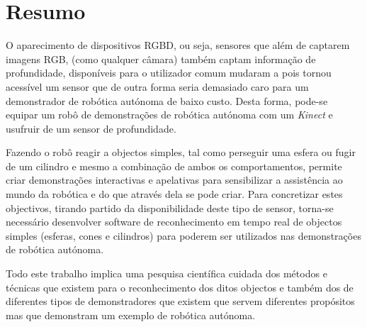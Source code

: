 \chapter{Resumo}

O aparecimento de dispositivos RGBD, ou seja, sensores que além de captarem imagens RGB,
(como qualquer câmara) também captam informação de profundidade, disponíveis para o utilizador
comum mudaram a pois tornou acessível um sensor que de outra forma seria demasiado caro
para um demonstrador de robótica autónoma de baixo custo. Desta forma, pode-se equipar um robô de demonstrações de
robótica autónoma com um \emph{Kinect} e usufruir de um sensor de profundidade.

Fazendo o robô reagir a objectos simples, tal como perseguir uma esfera ou
fugir de um cilindro e mesmo a combinação de ambos os comportamentos, permite 
criar demonstrações interactivas e apelativas para sensibilizar a assistência 
ao mundo da robótica e do que através dela se pode criar. Para concretizar estes objectivos,
tirando partido da disponibilidade deste tipo de sensor, torna-se necessário desenvolver 
software de reconhecimento em tempo real de objectos simples (esferas, cones
e cilindros) para poderem ser utilizados nas demonstrações de robótica
autónoma. 

Todo este trabalho implica uma pesquisa científica cuidada dos métodos e técnicas
que existem para o reconhecimento dos ditos objectos e também dos de diferentes tipos
de demonstradores que existem que servem diferentes propósitos mas que demonstram
um exemplo de robótica autónoma.


